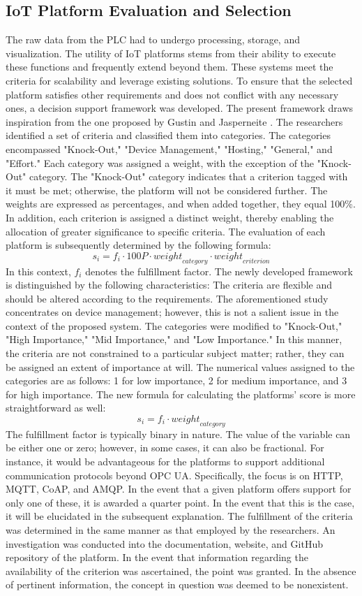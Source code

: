 \subsection{IoT Platform Evaluation and Selection} 
The raw data from the PLC had to undergo processing, storage, and visualization. The utility of IoT platforms stems from their ability to execute these functions and frequently extend beyond them.  These systems meet the criteria for scalability and leverage existing solutions. To ensure that the selected platform satisfies other requirements and does not conflict with any necessary ones, a decision support framework was developed. The present framework draws inspiration from the one proposed by Gustin and Jasperneite \cite{gustinIoTDeviceManagement2022}. The researchers identified a set of criteria and classified them into categories. The categories encompassed "Knock-Out," "Device Management," "Hosting," "General," and "Effort." Each category was assigned a weight, with the exception of the "Knock-Out" category. The "Knock-Out" category indicates that a criterion tagged with it must be met; otherwise, the platform will not be considered further. The weights are expressed as percentages, and when added together, they equal 100\%. In addition, each criterion is assigned a distinct weight, thereby enabling the allocation of greater significance to specific criteria. The evaluation of each platform is subsequently determined by the following formula:
\[ s_i = f_i \cdot 100P \cdot \mathit{weight}_{category} \cdot \mathit{weight}_{criterion} \]
In this context, $f_i$ denotes the fulfillment factor.
The newly developed framework is distinguished by the following characteristics: The criteria are flexible and should be altered according to the requirements. The aforementioned study concentrates on device management; however, this is not a salient issue in the context of the proposed system. The categories were modified to "Knock-Out," "High Importance," "Mid Importance," and "Low Importance." In this manner, the criteria are not constrained to a particular subject matter; rather, they can be assigned an extent of importance at will. The numerical values assigned to the categories are as follows: 1 for low importance, 2 for medium importance, and 3 for high importance. The new formula for calculating the platforms' score is more straightforward as well:
\[ s_i = f_i \cdot \mathit{weight}_{category} \]
The fulfillment factor is typically binary in nature. The value of the variable can be either one or zero; however, in some cases, it can also be fractional. For instance, it would be advantageous for the platforms to support additional communication protocols beyond OPC UA. Specifically, the focus is on HTTP, MQTT, CoAP, and AMQP. In the event that a given platform offers support for only one of these, it is awarded a quarter point. In the event that this is the case, it will be elucidated in the subsequent explanation. The fulfillment of the criteria was determined in the same manner as that employed by the researchers. An investigation was conducted into the documentation, website, and GitHub repository of the platform. In the event that information regarding the availability of the criterion was ascertained, the point was granted. In the absence of pertinent information, the concept in question was deemed to be nonexistent.
